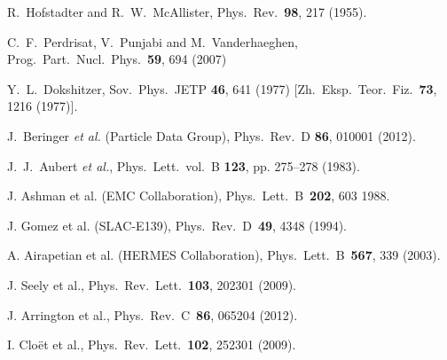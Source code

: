 \documentclass[twocolumn,nofootinbib,showpacs,prl,superscriptaddress,secnumarabic,amssymb,nobibnotes,aps,floatfix]{revtex4}
\begin{document}
\begin{thebibliography}{99}

 R.~Hofstadter and R.~W.~McAllister,
Phys.\ Rev.\  {\bf 98}, 217 (1955).

 C.~F.~Perdrisat, V.~Punjabi and M.~Vanderhaeghen,
Prog.\ Part.\ Nucl.\ Phys.\  {\bf 59}, 694 (2007)

 Y.~L.~Dokshitzer,
Sov.\ Phys.\ JETP {\bf 46}, 641 (1977)
[Zh.\ Eksp.\ Teor.\ Fiz.\  {\bf 73}, 1216 (1977)].

 J.~Beringer {\it et al.} (Particle Data Group), Phys.\ Rev.\ D 
   {\bf 86}, 010001 (2012).

   J.~J.~Aubert {\it et al.}, 
      Phys.\ Lett.\, vol.\ B { \bf 123}, pp. 275–278 (1983).


J. Ashman et al. (EMC Collaboration), 
      Phys.\ Lett.\ B\ {\bf 202}, 603 1988.

J. Gomez et al. (SLAC-E139), 
      Phys.\ Rev.\ D\ {\bf 49}, 4348 (1994).

A. Airapetian et al. (HERMES Collaboration), 
      Phys.\ Lett.\ B\ {\bf 567}, 339 (2003).

J. Seely et al., 
      Phys.\ Rev.\ Lett.\ {\bf 103}, 202301 (2009).

J. Arrington et al., 
      Phys.\ Rev.\ C\ {\bf 86}, 065204 (2012).  

I. Clo\"et et al., 
Phys.\ Rev.\ Lett.\ {\bf 102}, 252301 (2009).


\end{thebibliography}
\end{document}
